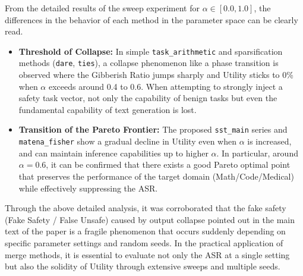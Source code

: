 \documentclass{article}
\begin{document}

From the detailed results of the sweep experiment for $\alpha \in [0.0, 1.0]$, the differences in the behavior of each method in the parameter space can be clearly read.

\begin{itemize}
    \item \textbf{Threshold of Collapse:} In simple \texttt{task\_arithmetic} and sparsification methods (\texttt{dare}, \texttt{ties}), a collapse phenomenon like a phase transition is observed where the Gibberish Ratio jumps sharply and Utility sticks to 0\% when $\alpha$ exceeds around 0.4 to 0.6. When attempting to strongly inject a safety task vector, not only the capability of benign tasks but even the fundamental capability of text generation is lost.
    \item \textbf{Transition of the Pareto Frontier:} The proposed \texttt{sst\_main} series and \texttt{matena\_fisher} show a gradual decline in Utility even when $\alpha$ is increased, and can maintain inference capabilities up to higher $\alpha$. In particular, around $\alpha=0.6$, it can be confirmed that there exists a good Pareto optimal point that preserves the performance of the target domain (Math/Code/Medical) while effectively suppressing the ASR.
\end{itemize}

Through the above detailed analysis, it was corroborated that the fake safety (Fake Safety / False Unsafe) caused by output collapse pointed out in the main text of the paper is a fragile phenomenon that occurs suddenly depending on specific parameter settings and random seeds. In the practical application of merge methods, it is essential to evaluate not only the ASR at a single setting but also the solidity of Utility through extensive sweeps and multiple seeds.
\end{document}
